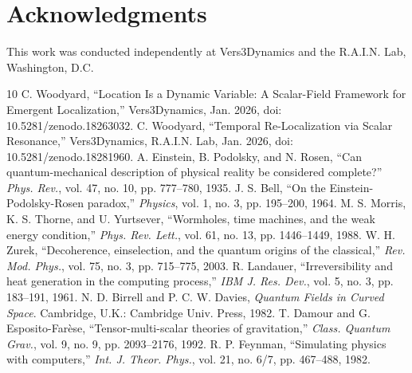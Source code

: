 \documentclass[conference,letterpaper,10pt]{IEEEtran}
\begin{document}
\section*{Acknowledgments}
This work was conducted independently at Vers3Dynamics and the R.A.I.N. Lab, Washington, D.C.

\begin{thebibliography}{10}
C. Woodyard, ``Location Is a Dynamic Variable: A Scalar-Field Framework for Emergent Localization,'' Vers3Dynamics,
Jan. 2026, doi: 10.5281/zenodo.18263032.
C. Woodyard, ``Temporal Re-Localization via Scalar Resonance,'' Vers3Dynamics, R.A.I.N. Lab, Jan. 2026, doi:
10.5281/zenodo.18281960.
A. Einstein, B. Podolsky, and N. Rosen, ``Can quantum-mechanical description of physical reality be considered
complete?'' \emph{Phys. Rev.}, vol. 47, no. 10, pp. 777--780, 1935.
J. S. Bell, ``On the Einstein-Podolsky-Rosen paradox,'' \emph{Physics}, vol. 1, no. 3, pp. 195--200, 1964.
M. S. Morris, K. S. Thorne, and U. Yurtsever, ``Wormholes, time machines, and the weak energy condition,'' \emph{Phys.
Rev. Lett.}, vol. 61, no. 13, pp. 1446--1449, 1988.
W. H. Zurek, ``Decoherence, einselection, and the quantum origins of the classical,'' \emph{Rev. Mod. Phys.}, vol. 75,
no. 3, pp. 715--775, 2003.
R. Landauer, ``Irreversibility and heat generation in the computing process,'' \emph{IBM J. Res. Dev.}, vol. 5, no. 3,
pp. 183--191, 1961.
N. D. Birrell and P. C. W. Davies, \emph{Quantum Fields in Curved Space}. Cambridge, U.K.: Cambridge Univ. Press,
1982.
T. Damour and G. Esposito-Farèse, ``Tensor-multi-scalar theories of gravitation,'' \emph{Class. Quantum Grav.}, vol.
9, no. 9, pp. 2093--2176, 1992.
R. P. Feynman, ``Simulating physics with computers,'' \emph{Int. J. Theor. Phys.}, vol. 21, no. 6/7, pp. 467--488,
1982.
\end{thebibliography}
\end{document}
